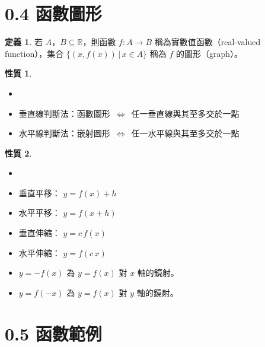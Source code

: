 \documentclass[12pt]{extarticle}
\newcommand{\ifff}{\,\Longleftrightarrow\,}
\theoremstyle{definition}
\newtheorem*{dfn}{定義}
\newtheorem*{prp}{性質}
\newcommand{\myline}{\noindent\makebox[\linewidth]{\rule{\paperwidth}{0.4pt}}}
\begin{document}
\myline

\section*{0.4 函數圖形}

\begin{dfn}
  若 $A$，$B\subseteq\mathbb{R}$，則函數 $f: A\to B$ 稱為實數值函數（real-valued function），集合 $\{(x, f(x))\,|\,x\in A\}$ 稱為 $f$ 的圖形（graph）。
\end{dfn}

\begin{prp}
  \begin{itemize}\setlength\itemsep{0em}
    \item[]
    \item 垂直線判斷法：函數圖形 $\ifff$ 任一垂直線與其至多交於一點
    \item 水平線判斷法：嵌射圖形 $\ifff$ 任一水平線與其至多交於一點
  \end{itemize}
\end{prp}

\begin{prp}
  \begin{itemize}\setlength\itemsep{0em}
    \item[]
    \item 垂直平移： $y = f(x) + h$
    \item 水平平移： $y = f(x + h)$
    \item 垂直伸縮： $y = c\,f(x)$
    \item 水平伸縮： $y = f(c\,x)$
    \item $y = -f(x)$ 為 $y = f(x)$ 對 $x$ 軸的鏡射。
    \item $y = f(-x)$ 為 $y = f(x)$ 對 $y$ 軸的鏡射。
  \end{itemize}
\end{prp}

\section*{0.5 函數範例}
\end{document}
